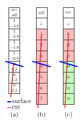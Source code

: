 \begin{figure}
    \centering
    \vspace*{-0.25cm}
    \begin{subfigure}[t]{0.425\linewidth}
        \vspace{0px}
        \centering
        \includegraphics[width=1\linewidth]{fig/method_sdf_2}
    \end{subfigure}
    \hfill
    \begin{subfigure}[t]{0.5\linewidth}
        \vspace{3px}
        \centering
        \hspace*{-12px}

\end{subfigure}
\end{figure}
